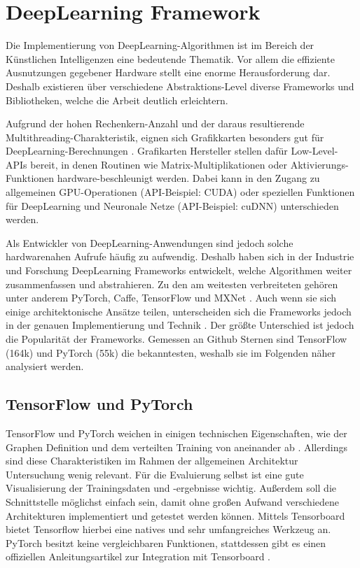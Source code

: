 
\section{DeepLearning Framework}
Die Implementierung von DeepLearning-Algorithmen ist im Bereich der Künstlichen Intelligenzen eine bedeutende Thematik.
Vor allem die effiziente Ausnutzungen gegebener Hardware stellt eine enorme Herausforderung dar. 
Deshalb existieren über verschiedene Abstraktions-Level diverse Frameworks und Bibliotheken, welche die Arbeit deutlich erleichtern.
\newline

Aufgrund der hohen Rechenkern-Anzahl und der daraus resultierende Multithreading-Charakteristik, eignen sich Grafikkarten besonders gut für DeepLearning-Berechnungen \cite{gpu-for-dl}.
Grafikarten Hersteller stellen dafür Low-Level-APIs bereit, in denen Routinen wie Matrix-Multiplikationen oder Aktivierungs-Funktionen hardware-beschleunigt werden.
Dabei kann in den Zugang zu allgemeinen GPU-Operationen (API-Beispiel: CUDA) oder speziellen Funktionen für DeepLearning und Neuronale Netze (API-Beispiel: cuDNN) unterschieden werden.
\newline

Als Entwickler von DeepLearning-Anwendungen sind jedoch solche hardwarenahen Aufrufe häufig zu aufwendig.
Deshalb haben sich in der Industrie und Forschung DeepLearning Frameworks entwickelt, welche Algorithmen weiter zusammenfassen und abstrahieren.
Zu den am weitesten verbreiteten gehören unter anderem PyTorch, Caffe, TensorFlow und MXNet \cite{dl-framework-evaluation}. 
Auch wenn sie sich einige architektonische Ansätze teilen, unterscheiden sich die Frameworks jedoch in der genauen Implementierung und Technik \cite{dl-framework-evaluation}.
Der größte Unterschied ist jedoch die Popularität der Frameworks.
Gemessen an Github Sternen sind TensorFlow (164k) \cite{github-tensorflow} und PyTorch (55k) \cite{github-pytorch} die bekanntesten, weshalb sie im Folgenden näher analysiert werden.
 
\subsection{TensorFlow und PyTorch}
TensorFlow und PyTorch weichen in einigen technischen Eigenschaften, wie der Graphen Definition und dem verteilten Training von aneinander ab \cite{pytorch-vs-tensorflow}.
Allerdings sind diese Charakteristiken im Rahmen der allgemeinen Architektur Untersuchung wenig relevant.
Für die Evaluierung selbst ist eine gute Visualisierung der Trainingsdaten und -ergebnisse wichtig.
Außerdem soll die Schnittstelle möglichst einfach sein, damit ohne großen Aufwand verschiedene Architekturen implementiert und getestet werden können.
Mittels Tensorboard bietet Tensorflow hierbei eine natives und sehr umfangreiches Werkzeug an.
PyTorch besitzt keine vergleichbaren Funktionen, stattdessen gibt es einen offiziellen Anleitungsartikel zur Integration mit Tensorboard \cite{pytorch-tensorboard-offical-documentation}.

